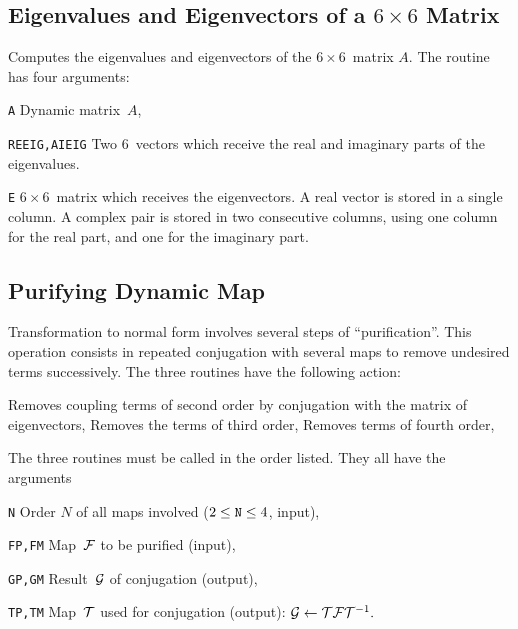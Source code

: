 \subsection{Eigenvalues and Eigenvectors of a $6 \times 6$ Matrix}
\label{LADEIG}
Computes the eigenvalues and eigenvectors
of the $6 \times 6$~matrix $A$.
The routine has four arguments:
\begin{mylist}
\item[\tt A]
Dynamic matrix~$A$,
\item[\tt REEIG,AIEIG]
Two $6$~vectors which receive the real and imaginary parts of the
eigenvalues.
\item[\tt E]
$6 \times 6$~matrix which receives the eigenvectors.
A real vector is stored in a single column.
A complex pair is stored in two consecutive columns,
using one column for the real part, and one for the imaginary part.
\end{mylist}
 
\subsection{Purifying Dynamic Map}
\label{LADPUR}
Transformation to normal form involves several steps of
``purification''. 
This operation consists in repeated conjugation with several maps
to remove undesired terms successively.
The three routines
have the following action:
\begin{mylist}
Removes coupling terms of second order
by conjugation with the matrix of eigenvectors,
Removes the terms of third order,
Removes terms of fourth order,
\end{mylist}
The three routines must be called in the order listed.
They all have the arguments
\begin{mylist}
\item[\tt N]
Order $N$ of all maps involved ($2 \le \hbox{\tt N} \le 4$, input),
\item[\tt FP,FM]
Map~$\cal F$ to be purified (input),
\item[\tt GP,GM]
Result~$\cal G$ of conjugation (output),
\item[\tt TP,TM]
Map~$\cal T$ used for conjugation (output):
${\cal G} \leftarrow {\cal T} {\cal F} {\cal T}^{-1}.$
\end{mylist}

